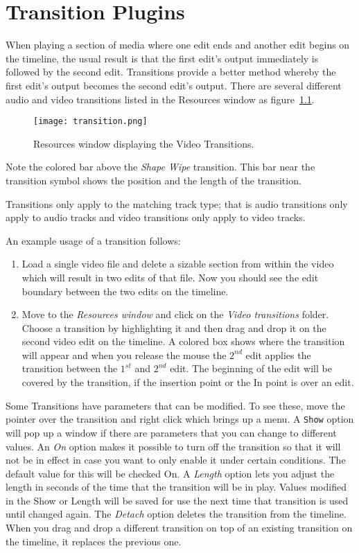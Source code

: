 \chapter{Transition Plugins}%
\label{cha:transition_plugin}

When playing a section of media where one edit ends and another edit begins on the timeline,
the usual result is that the first edit's output immediately is followed by the second edit.  Transitions provide a better method whereby the first edit’s output becomes the second edit’s output.  There are several different audio and video transitions listed in the Resources window as figure~\ref{fig:transition}.

\begin{figure}[htpb]
    \centering
    \texttt{[image: transition.png]}
    \caption{Resources window displaying the Video Transitions.}
    \label{fig:transition}
\end{figure}

Note the colored bar above the \textit{Shape Wipe} transition.
This bar near the transition symbol shows the position and the length of the transition.

Transitions only apply to the matching track type; that is audio transitions only apply to audio tracks
and video transitions only apply to video tracks.

An example usage of a transition follows:
\begin{enumerate}
    \item Load a single video file and delete a sizable section from within the video which will result in two edits of that file. Now you should see the edit boundary between the two edits on the timeline.
    \item Move to the \textit{Resources window} and click on the \textit{Video transitions} folder. Choose a transition by highlighting it and then drag and drop it on the second video edit on the timeline. A colored box shows where the transition will appear and when you release the mouse the $2^{nd}$ edit applies the transition between the $1^{st}$ and $2^{nd}$ edit.
The beginning of the edit will be covered by the transition, if the insertion point or the In point is over an edit.
\end{enumerate}
Some Transitions have parameters that can be modified. To see these, move the pointer over the transition and right click which brings up a menu. A \texttt{Show} option will pop up a window if there are parameters that you can change to different values. 
An \textit{On} option makes it possible to turn off the transition so that it will not be in effect in case you want to only enable it under certain conditions.  The default value for this will be checked On.
A \textit{Length} option lets you adjust the length in seconds of the time that the transition will be in play.  Values modified in the Show or Length will be saved for use the next time that transition is used until changed again. 
The \textit{Detach} option deletes the transition from the timeline. When you drag and drop a different transition on top of an existing transition on the timeline, it replaces the previous one.

